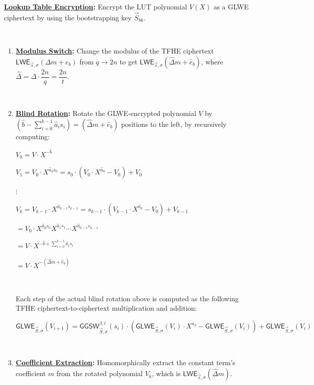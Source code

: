 \begin{tcolorbox}[title={\textbf{\tboxlabel{\ref*{subsec:tfhe-summary}} TFHE Noise Bootstrapping Procedure}}]

\textbf{\underline{Lookup Table Encryption}:} Encrypt the LUT polynomial $V(X)$ as a GLWE ciphertext by using the bootstrapping key $\vec{S}_{bk}$.

$ $
  
\begin{enumerate}
\item \textbf{\underline{Modulus Switch}:} Change the modulus of the TFHE ciphertext $\textsf{LWE}_{\vec{s}, \sigma}(\Delta m + e_b)$ from $q \rightarrow 2n$ to get $\textsf{LWE}_{\vec{s}, \sigma}(\hat{\Delta} m + \hat e_b)$, where $\hat\Delta = \Delta \cdot \dfrac{2n}{q} = \dfrac{2n}{t}$.

$ $

\item \textbf{\underline{Blind Rotation}:} Rotate the GLWE-encrypted polynomial $V$ by $(\hat{b} - \sum\limits_{i=0}^{k-1}{\hat{a}_is_i}) = (\hat{\Delta}m + \hat{e}_b)$ positions to the left, by recursively computing: 

$V_0 = V \cdot X^{-\hat{b}}$

$V_1 = V_0 \cdot X^{\hat{a}_0s_0} = s_0 \cdot (V_0 \cdot X^{\hat{a}_0} - V_0) + V_0$

\text{ } $\vdots$

$V_k = V_{k-1} \cdot X^{\hat{a}_{k-1}s_{k-1}} = s_{k-1} \cdot (V_{k-1} \cdot X^{\hat{a}_0} - V_0) + V_{k-1}$

$= V_0 \cdot X^{\hat{a}_0s_0}X^{\hat{a}_1s_1}\cdots X^{\hat{a}_{k-1}s_{k-1}}$

$= V \cdot X^{- \hat{b} + \sum_{i=0}^{k-1}{\hat{a}_is_i}} $

$ = V \cdot X^{-(\hat{\Delta}m + \hat{e}_b)}$

$ $

\noindent Each step of the actual blind rotation above is computed as the following TFHE ciphertext-to-ciphertext multiplication and addition:

$\textsf{GLWE}_{\vec{S}, \sigma}(V_{i+1}) = \textsf{GGSW}_{\vec{S}, \sigma}^{\beta, l}(s_i) \cdot (\textsf{GLWE}_{\vec{S}, \sigma}(V_i) \cdot X^{a_0} - \textsf{GLWE}_{\vec{S}, \sigma}(V_i)) + \textsf{GLWE}_{\vec{S}, \sigma}(V_i)$

$ $

\item \textbf{\underline{Coefficient Extraction}:} Homomorphically extract the constant term's coefficient $m$ from the rotated polynomial $V_k$, which is $\textsf{LWE}_{\vec{s}, \sigma}(\hat{\Delta}m)$. 


\end{enumerate}
\end{tcolorbox}
